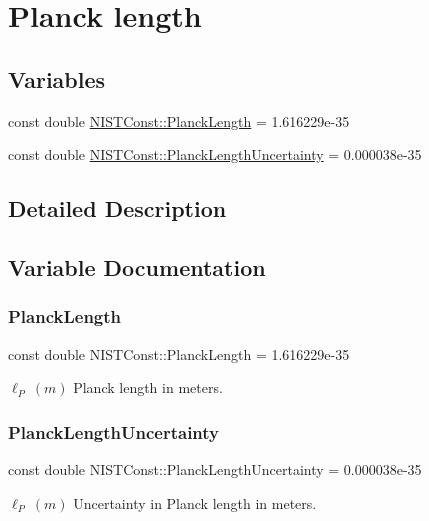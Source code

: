 \hypertarget{group___planck_length}{}\section{Planck length}
\label{group___planck_length}
\subsection*{Variables}
\begin{DoxyCompactItemize}
\item 
const double \hyperlink{group___planck_length_ga1bc5c33e67f9810e7505b30076df5ca3}{N\+I\+S\+T\+Const\+::\+Planck\+Length} = 1.\+616229e-\/35
\item 
const double \hyperlink{group___planck_length_ga2d3d3a738fb656be716e3acf32fdc7d5}{N\+I\+S\+T\+Const\+::\+Planck\+Length\+Uncertainty} = 0.\+000038e-\/35
\end{DoxyCompactItemize}


\subsection{Detailed Description}


\subsection{Variable Documentation}
\mbox{\label{group___planck_length_ga1bc5c33e67f9810e7505b30076df5ca3}} 
\subsubsection{\texorpdfstring{Planck\+Length}{PlanckLength}}
{\footnotesize\ttfamily const double N\+I\+S\+T\+Const\+::\+Planck\+Length = 1.\+616229e-\/35}

$\ell_P \ (m)$ Planck length in meters. \mbox{\label{group___planck_length_ga2d3d3a738fb656be716e3acf32fdc7d5}} 
\subsubsection{\texorpdfstring{Planck\+Length\+Uncertainty}{PlanckLengthUncertainty}}
{\footnotesize\ttfamily const double N\+I\+S\+T\+Const\+::\+Planck\+Length\+Uncertainty = 0.\+000038e-\/35}

$\ell_P \ (m)$ Uncertainty in Planck length in meters. 